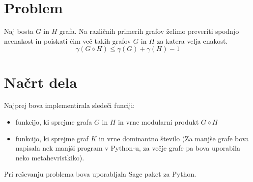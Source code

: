 \documentclass[a4paper,12pt]{article}
\begin{document}
\section{Problem}
Naj bosta $G$ in $H$ grafa.
Na različnih primerih grafov želimo preveriti 
spodnjo neenakost in poiskati čim več takih grafov $G$ in $H$ za katera velja enakost.
\begin{equation}
    \gamma(G\diamond H) \leq \gamma (G) + \gamma (H) - 1
\end{equation}
    
\section{Načrt dela}
Najprej bova implementirala sledeči funciji:
    \begin{itemize}
        \item funkcijo, ki sprejme grafa $G$ in $H$ in vrne modularni produkt $G \diamond H$
        \item funkcijo, ki sprejme graf $K$ in vrne dominantno število (Za manjše grafe bova napisala nek manjši program v Python-u,
        za večje grafe pa bova uporabila neko metahevristkiko).
    \end{itemize}
Pri reševanju problema bova uporabljala Sage paket za Python.
\end{document}
